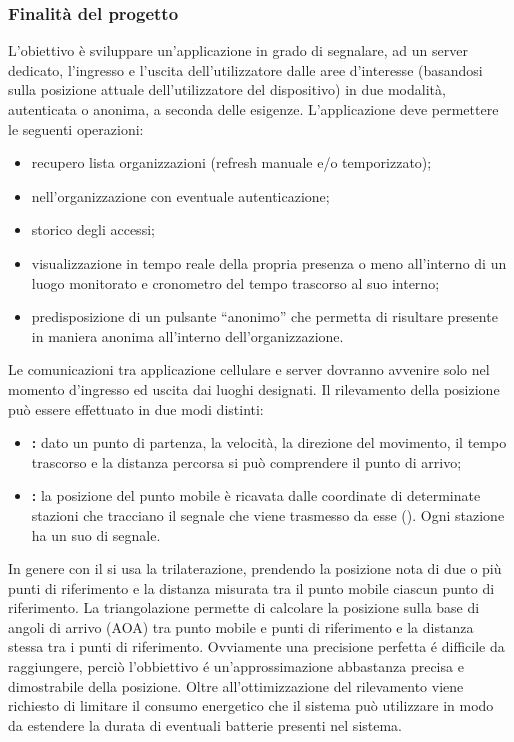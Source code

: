 	\subsubsection{Finalità del progetto}
		L’obiettivo è sviluppare un’applicazione in grado di segnalare, ad un server dedicato, l’ingresso e l’uscita dell’utilizzatore dalle aree d’interesse (basandosi sulla posizione attuale dell'utilizzatore del dispositivo) in due modalità, autenticata o anonima, a seconda delle esigenze.
		L’applicazione deve permettere le seguenti operazioni:
		\begin{itemize}
			\item recupero lista organizzazioni (refresh manuale e/o temporizzato);
			\item {} nell’organizzazione con eventuale autenticazione;
			\item storico degli accessi;
			\item visualizzazione in tempo reale della propria presenza o meno all’interno di un luogo monitorato e cronometro del tempo trascorso al suo interno;
			\item predisposizione di un pulsante ``anonimo'' che permetta di risultare presente in maniera anonima all'interno dell'organizzazione.
		\end{itemize}
		Le comunicazioni tra applicazione cellulare e server dovranno avvenire solo nel momento d'ingresso ed uscita dai luoghi designati. Il rilevamento della posizione può essere effettuato in due modi distinti:
		\begin{itemize}
			\item \textbf{:} dato un punto di partenza, la velocità, la direzione del movimento, il tempo trascorso e la distanza percorsa si può comprendere il punto di arrivo;
			\item \textbf{:} la posizione del punto mobile è ricavata dalle coordinate di determinate stazioni che tracciano il segnale che viene trasmesso da esse (). Ogni stazione ha un suo  di segnale.
		\end{itemize}
		In genere con il  si usa la trilaterazione, prendendo la posizione nota di due o più punti di riferimento e la distanza misurata tra il punto mobile ciascun punto di riferimento. La triangolazione permette di calcolare la posizione sulla base di angoli di arrivo (AOA) tra punto mobile e punti di riferimento e la distanza stessa tra i punti di riferimento. Ovviamente una precisione perfetta é difficile da raggiungere, perciò l'obbiettivo é un'approssimazione abbastanza precisa e dimostrabile della posizione. Oltre all'ottimizzazione del rilevamento viene richiesto di limitare il consumo energetico che il sistema può utilizzare in modo da estendere la durata di eventuali batterie presenti nel sistema.

